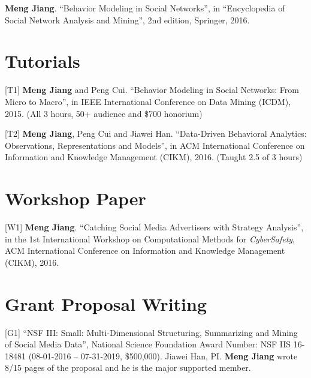 \documentclass[margin, 10pt]{res}
\begin{document}
\begin{resume}
[B2] \textbf{Meng Jiang}. ``Behavior Modeling in Social Networks'', in ``Encyclopedia of Social Network Analysis and Mining'', 2nd edition, Springer, 2016.


\section{Tutorials}

[T1] \textbf{Meng Jiang} and Peng Cui. ``Behavior Modeling in Social Networks: From Micro to Macro'', in IEEE International Conference on Data Mining (ICDM), 2015. (All 3 hours, 50+ audience and \$700 honorium)

[T2] \textbf{Meng Jiang}, Peng Cui and Jiawei Han. ``Data-Driven Behavioral Analytics: Observations, Representations and Models'', in ACM International Conference on Information and Knowledge Management (CIKM), 2016. (Taught 2.5 of 3 hours)


\section{Workshop Paper}

[W1] \textbf{Meng Jiang}. ``Catching Social Media Advertisers with Strategy Analysis'', in the 1st International Workshop on Computational Methods for \textit{CyberSafety}, ACM International Conference on Information and Knowledge Management (CIKM), 2016.


\section{Grant Proposal Writing}

[G1] ``NSF III: Small: Multi-Dimensional Structuring, Summarizing and Mining of Social Media Data'', National Science Foundation Award Number: NSF IIS 16-18481 (08-01-2016 -- 07-31-2019, \$500,000). Jiawei Han, PI. \textbf{Meng Jiang} wrote 8/15 pages of the proposal and he is the major supported member.


\end{resume}
\end{document}
